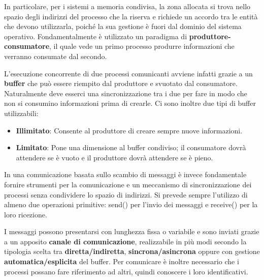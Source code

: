 \noindent In particolare, per i sistemi a memoria condivisa, la zona allocata si trova nello spazio degli indirizzi del processo che la riserva e richiede un accordo tra le entità che devono utilizzarla, poiché la sua gestione è fuori dal dominio del sistema operativo. Fondamentalmente è utilizzato un paradigma di \textbf{produttore-consumatore}, il quale vede un primo processo produrre informazioni che verranno consumate dal secondo.\par
L'esecuzione concorrente di due processi comunicanti avviene infatti grazie a un \textbf{buffer} che può essere riempito dal produttore e svuotato dal consumatore. Naturalmente deve esserci una sincronizzazione tra i due per fare in modo che non si consumino informazioni prima di crearle. Ci sono inoltre due tipi di buffer utilizzabili: \begin{itemize}
	\item \textbf{Illimitato}: Consente al produttore di creare sempre nuove informazioni.
	\item \textbf{Limitato}: Pone una dimensione al buffer condiviso; il consumatore dovrà attendere se è vuoto e il produttore dovrà attendere se è pieno.
\end{itemize}
\noindent In una comunicazione basata sullo scambio di messaggi è invece fondamentale fornire strumenti per la comunicazione e un meccanismo di sincronizzazione dei processi senza condividere lo spazio di indirizzi. Si prevede sempre l'utilizzo di almeno due operazioni primitive: send() per l'invio dei messaggi e receive() per la loro ricezione.\par
I messaggi possono presentarsi con lunghezza fissa o variabile e sono inviati grazie a un apposito \textbf{canale di comunicazione}, realizzabile in più modi secondo la tipologia scelta tra \textbf{diretta/indiretta}, \textbf{sincrona/asincrona} oppure con gestione \textbf{automatica/esplicita} del buffer. Per comunicare è inoltre necessario che i processi possano fare riferimento ad altri, quindi conoscere i loro identificativi.\newline


